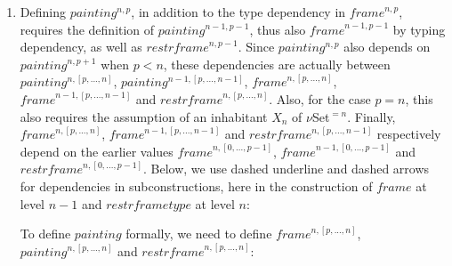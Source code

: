 \documentclass{article}
\newcommand{\myframe}{\mathit{frame}}
\newcommand{\painting}{\mathit{painting}}
\newcommand{\restrframe}{\mathit{restrframe}}
\newcommand{\restrframetype}{\mathit{restrframetype}}
\newcommand{\udensdash}[1]{%
    \tikz[baseline=(todotted.base)]{
        \node[inner sep=1pt,outer sep=0pt] (todotted) {$#1$};
        \draw[densely dashed] (todotted.south west) -- (todotted.south east);
    }%
}%
\begin{document}
\begin{enumerate}
  \item Defining $\painting^{n,p}$, in addition to the type dependency
        in $\myframe^{n,p}$, requires the definition of
        $\painting^{n-1,p-1}$, thus also $\myframe^{n-1,p-1}$ by typing
        dependency, as well as $\restrframe^{n,p-1}$. Since
        $\painting^{n,p}$ also depends on $\painting^{n,p+1}$ when $p<n$,
        these dependencies are actually between $\painting^{n,[p,...,n]}$,
        $\painting^{n-1,[p,...,n-1]}$, $\myframe^{n,[p,...,n]}$,
        $\myframe^{n-1,[p,...,n-1]}$ and $\restrframe^{n,[p,...,n]}$. Also,
        for the case $p=n$, this also requires the assumption of an
        inhabitant $X_{n}$ of $\nu$Set$^{=n}$. Finally,
        $\myframe^{n,[p,...,n]}$, $\myframe^{n-1,[p,...,n-1]}$ and
        $\restrframe^{n,[p,...,n-1]}$ respectively depend on the earlier
        values $\myframe^{n,[0,...,p-1]}$, $\myframe^{n-1,[0,...,p-1]}$ and
        $\restrframe^{n,[0,...,p-1]}$.  Below, we use dashed underline and
        dashed arrows for dependencies in subconstructions, here in the
        construction of $\myframe$ at level $n-1$ and $\restrframetype$ at
        level $n$:
        \begin{center}
        \end{center}

To define $\painting$ formally, we need to define $\myframe^{n,[p,...,n]}$, $\painting^{n,[p,...,n]}$ and $\restrframe^{n,[p,...,n]}$:


\end{enumerate}
\end{document}
